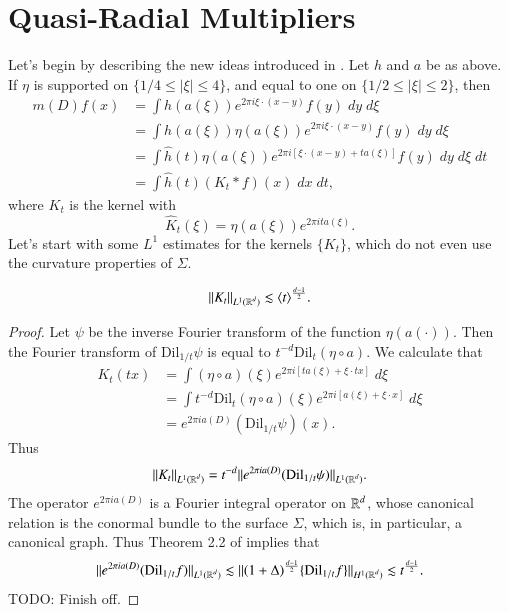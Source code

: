 \section{Quasi-Radial Multipliers}

Let's begin by describing the new ideas introduced in \cite{KimQuasiradial}. Let $h$ and $a$ be as above. If $\eta$ is supported on $\{ 1/4 \leq |\xi| \leq 4 \}$, and equal to one on $\{ 1/2 \leq |\xi| \leq 2 \}$, then
%
\begin{align*}
    m(D)f(x) &= \int h(a(\xi)) e^{2 \pi i \xi \cdot (x - y)} f(y)\; dy\; d\xi\\
    &= \int h(a(\xi)) \eta(a(\xi)) e^{2 \pi i \xi \cdot (x - y)} f(y)\; dy\; d\xi\\
    &= \int \widehat{h}(t) \eta(a(\xi)) e^{2 \pi i [ \xi \cdot (x - y) + t a(\xi) ]} f(y)\; dy\; d\xi\; dt\\
    &= \int \widehat{h}(t) (K_t * f)(x)\; dx\; dt,
\end{align*}
%
where $K_t$ is the kernel with
\[ \widehat{K}_t(\xi) = \eta(a(\xi)) e^{2 \pi i t a(\xi)}. \]
%
Let's start with some $L^1$ estimates for the kernels $\{ K_t \}$, which do not even use the curvature properties of $\Sigma$.

\begin{theorem}
    \[ \| K_t \|_{L^1(\operatorname{\mathbb{R}}^d)} \lesssim \langle t \rangle^{\frac{d-1}{2}}. \]
\end{theorem}
\begin{proof}
    Let $\psi$ be the inverse Fourier transform of the function $\eta(a(\cdot))$. Then the Fourier transform of $\text{Dil}_{1/t} \psi$ is equal to $t^{-d} \text{Dil}_t (\eta \circ a)$. We calculate that
    \begin{align*}
        K_t(tx) &= \int (\eta \circ a)(\xi) e^{2 \pi i [t a(\xi) + \xi \cdot tx]}\; d\xi\\
        &= \int t^{-d} \text{Dil}_t (\eta \circ a)(\xi) e^{2 \pi i [ a(\xi) + \xi \cdot x ]}\; d\xi\\
        &= e^{2 \pi i a(D)} (\text{Dil}_{1/t} \psi) (x).
    \end{align*}
    Thus
    \[ \| K_t \|_{L^1(\operatorname{\mathbb{R}}^d)} = t^{-d} \| e^{2 \pi i a(D)} ( \text{Dil}_{1/t} \psi ) \|_{L^1(\operatorname{\mathbb{R}}^d)}. \]
    The operator $e^{2 \pi i a(D)}$ is a Fourier integral operator on $\operatorname{\mathbb{R}}^d$, whose canonical relation is the conormal bundle to the surface $\Sigma$, which is, in particular, a canonical graph. Thus Theorem 2.2 of \cite{SeegerSoggeStein} implies that
    \[ \| e^{2 \pi i a(D)} ( \text{Dil}_{1/t} f ) \|_{L^1(\operatorname{\mathbb{R}}^d)} \lesssim \| (1 + \Delta)^{\frac{d-1}{2}} \{ \text{Dil}_{1/t} f \} \|_{H^1(\operatorname{\mathbb{R}}^d)} \lesssim t^{\frac{d-1}{2}}. \]
    TODO: Finish off.
\end{proof}

